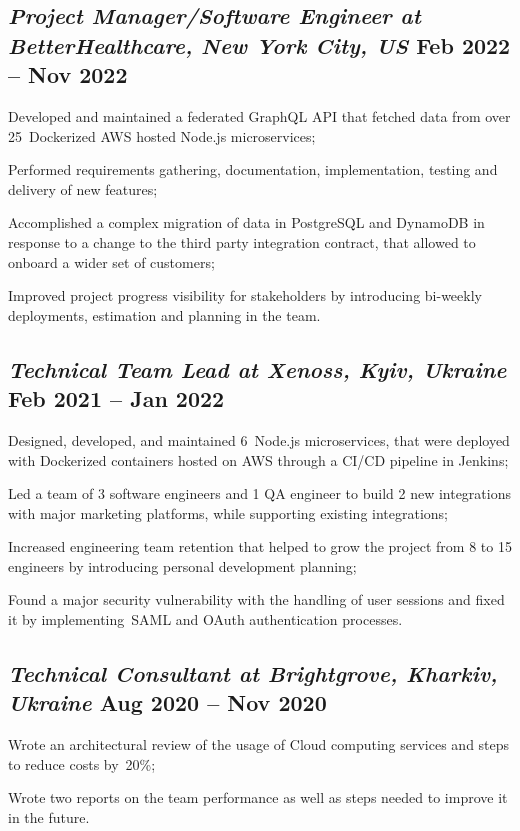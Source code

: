 \documentclass[a4paper,12pt]{book}
\begin{document}
\subsection{{\sl\bf\hspace{0.1in}Project Manager/Software Engineer at BetterHealthcare,  New York City, US} \hfill Feb 2022 -- Nov 2022}
\begin{zitemize}
\item Developed and maintained a federated GraphQL API that fetched data from over 25~Dockerized AWS hosted Node.js microservices;
\item Performed requirements gathering, documentation, implementation, testing and delivery of new features;
\item Accomplished a complex migration of data in PostgreSQL and DynamoDB in response to a change to the third party integration contract, that allowed to onboard a wider set of customers; 
\item Improved project progress visibility for stakeholders by introducing bi-weekly deployments, estimation and planning in the team.
\end{zitemize}

\subsection{{\sl\bf\hspace{0.1in}Technical Team Lead at Xenoss, Kyiv, Ukraine } \hfill Feb 2021 -- Jan 2022}
\begin{zitemize}
 \item Designed, developed, and maintained 6~Node.js microservices, that were deployed with Dockerized containers hosted on AWS through a CI/CD pipeline in Jenkins;
 \item Led a team of 3 software engineers and 1 QA engineer to build 2 new integrations with major marketing platforms, while supporting existing integrations;
 \item Increased engineering team retention that helped to grow the project from 8 to 15 engineers by introducing personal development planning;
 \item Found a major security vulnerability with the handling of user sessions and fixed it by implementing~SAML and OAuth authentication processes.
\end{zitemize}

\subsection{{\sl\bf\hspace{0.1in}Technical Consultant at Brightgrove, Kharkiv, Ukraine } \hfill Aug 2020 -- Nov 2020}
\begin{zitemize}
 \item Wrote an architectural review of the usage of Cloud computing services and steps to reduce costs by~20\%;
 \item Wrote two reports on the team performance as well as steps needed to improve it in the future.
\end{zitemize}
\end{document}
